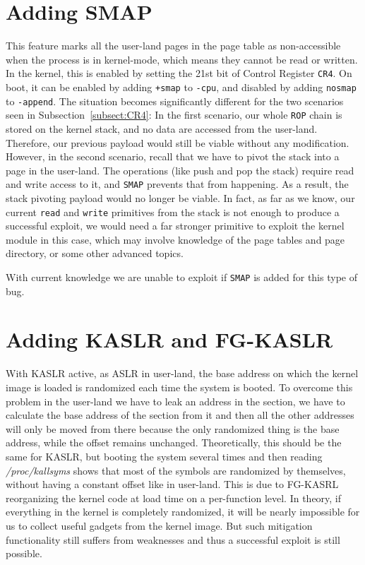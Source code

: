 \documentclass{masterthesis}
\newcommand{\refToSubSection}[1]{Subsection~\ref{subsect:#1}\xspace}
\begin{document}
\section{Adding SMAP}
\label{sect:addSmap}
This feature marks all the user-land pages in the page table as non-accessible when the process is in kernel-mode, which means they cannot be read or written.
In the kernel, this is enabled by setting the 21st bit of Control Register \texttt{CR4}.
On boot, it can be enabled by adding \texttt{+smap} to \texttt{-cpu}, and disabled by adding \texttt{nosmap} to \texttt{-append}.
The situation becomes significantly different for the two scenarios seen in \refToSubSection{CR4}:
In the first scenario, our whole \texttt{ROP} chain is stored on the kernel stack, and no data are accessed from the user-land. Therefore, our previous payload would still be viable without any modification.
However, in the second scenario, recall that we have to pivot the stack into a page in the user-land. The operations (like push and pop the stack) require read and write access to it, and \texttt{SMAP} prevents that from happening. As a result, the stack pivoting payload would no longer be viable. In fact, as far as we know, our current \texttt{read} and \texttt{write} primitives from the stack is not enough to produce a successful exploit, we would need a far stronger primitive to exploit the kernel module in this case, which may involve knowledge of the page tables and page directory, or some other advanced topics. 

With current knowledge we are unable to exploit if \texttt{SMAP} is added for this type of bug.
\section{Adding KASLR and FG-KASLR}
\label{sect:kaslr-fg-kaslr}
With KASLR active, as ASLR in user-land, the base address on which the kernel image is loaded is randomized each time the system is booted.
To overcome this problem in the user-land we have to leak an address in the section, we have to calculate the base address of the section from it and then all the other addresses will only be moved from there because the only randomized thing is the base address, while the offset remains unchanged.
Theoretically, this should be the same for KASLR, but booting the system several times and then reading \emph{/proc/kallsyms} shows that most of the symbols are randomized by themselves, without having a constant offset like in user-land.
This is due to FG-KASRL reorganizing the kernel code at load time on a per-function level.
In theory, if everything in the kernel is completely randomized, it will be nearly impossible for us to collect useful gadgets from the kernel image. But such mitigation functionality still suffers from weaknesses and thus a successful exploit is still possible.
\end{document}
